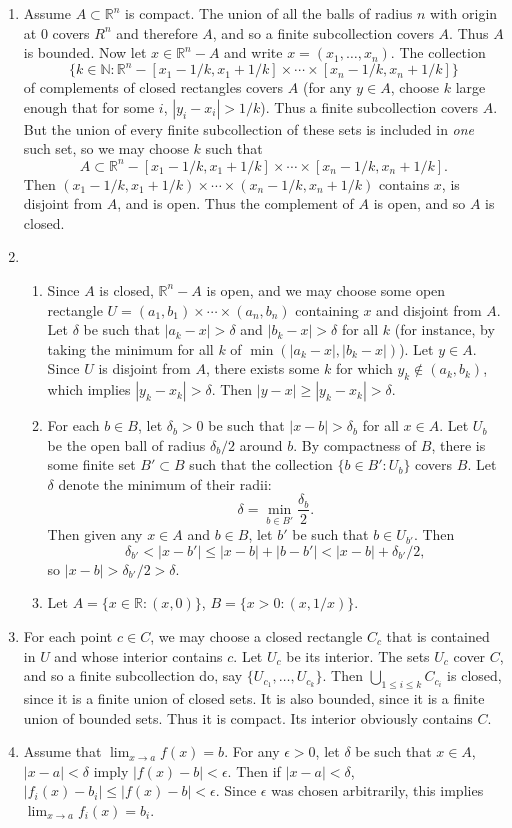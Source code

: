 \documentclass{article}
\begin{document}
\begin{enumerate}[label=\textbf{1-\arabic*.}]
\item Assume $A\subset\mathbb R^n$ is compact. The union of all the balls of radius $n$ with origin at $0$ covers $R^n$ and therefore $A$, and so a finite subcollection covers $A$. Thus $A$ is bounded. Now let $x\in\mathbb R^n-A$ and write $x=(x_1,\ldots,x_n)$. The collection \[\{k\in\mathbb N: \mathbb R^n - [x_1-1/k,x_1+1/k]\times\cdots\times[x_n-1/k,x_n+1/k]\}\] of complements of closed rectangles covers $A$ (for any $y\in A$, choose $k$ large enough that for some $i$, $|y_i - x_i| > 1/k$). Thus a finite subcollection covers $A$. But the union of every finite subcollection of these sets is included in \textit{one} such set, so we may choose $k$ such that \[A\subset \mathbb R^n - [x_1-1/k,x_1+1/k]\times\cdots\times [x_n-1/k,x_n+1/k].\] Then $(x_1-1/k,x_1+1/k)\times\cdots\times (x_n-1/k,x_n+1/k)$ contains $x$, is disjoint from $A$, and is open. Thus the complement of $A$ is open, and so $A$ is closed.
\item
\begin{enumerate}
\item Since $A$ is closed, $\mathbb R^n - A$ is open, and we may choose some open rectangle $U=(a_1,b_1)\times\cdots\times(a_n,b_n)$ containing $x$ and disjoint from $A$. Let $\delta$ be such that $|a_k - x| > \delta$ and $|b_k - x| > \delta$ for all $k$ (for instance, by taking the minimum for all $k$ of $\min(|a_k-x|,|b_k-x|)$). Let $y\in A$. Since $U$ is disjoint from $A$, there exists some $k$ for which $y_k\notin (a_k,b_k)$, which implies $|y_k - x_k| > \delta$. Then $|y-x| \geq |y_k - x_k| > \delta$.
\item For each $b\in B$, let $\delta_b > 0$ be such that $|x-b|>\delta_b$ for all $x\in A$. Let $U_b$ be the open ball of radius $\delta_b/2$ around $b$. By compactness of $B$, there is some finite set $B'\subset B$ such that the collection $\{b\in B':U_b\}$ covers $B$. Let $\delta$ denote the minimum of their radii: \[\delta = \min_{b\in B'} \frac{\delta_b}{2}.\] Then given any $x\in A$ and $b\in B$, let $b'$ be such that $b\in U_{b'}$. Then \[\delta_{b'} < |x-b'| \leq |x-b| + |b-b'| < |x-b| + \delta_{b'}/2,\] so $|x-b| > \delta_{b'}/2 > \delta$.
\item Let $A=\{x\in \mathbb R:(x,0)\}$, $B=\{x>0:(x,1/x)\}$.
\end{enumerate}
\item For each point $c\in C$, we may choose a closed rectangle $C_c$ that is contained in $U$ and whose interior contains $c$. Let $U_c$ be its interior. The sets $U_c$ cover $C$, and so a finite subcollection do, say $\{U_{c_1},\ldots,U_{c_k}\}$. Then $\bigcup_{1\leq i \leq k} C_{c_i}$ is closed, since it is a finite union of closed sets. It is also bounded, since it is a finite union of bounded sets. Thus it is compact. Its interior obviously contains $C$.
\item Assume that $\lim_{x\to a} f(x) = b$. For any $\epsilon > 0$, let $\delta$ be such that $x\in A$, $|x-a|<\delta$ imply $|f(x) - b| < \epsilon$. Then if $|x - a| < \delta$, $|f_i(x) - b_i| \leq |f(x)-b| < \epsilon$. Since $\epsilon$ was chosen arbitrarily, this implies $\lim_{x\to a} f_i(x) = b_i$.


\end{enumerate}
\end{document}
